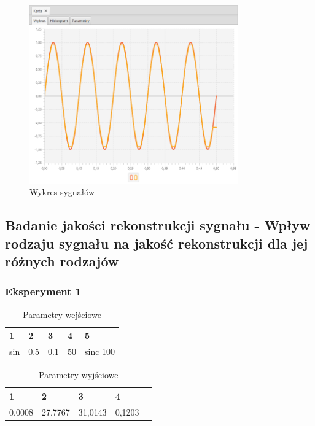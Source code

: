 \documentclass[12pt]{article}
\begin{document}
{{{                \begin{figure}[H]
                    \centering
                    \includegraphics[width=0.8\textwidth]{img/result/experiment1/10/data_draw_original_chart_recon_output_130307.png}
                    \caption{Wykres sygnałów}
                \end{figure}
            }
        }

        \subsection{Badanie jakości rekonstrukcji sygnału - Wpływ rodzaju sygnału na jakość
        rekonstrukcji dla jej różnych rodzajów} {

            \subsubsection{Eksperyment 1} {
                \begin{table}[H]
                    \centering
                    \begin{tabular}{|l|l|l|l|l|}
                        \hline
                        1 & 2 & 3 & 4 & 5   \\ \hline
                        sin & 0.5 & 0.1 & 50 & sinc 100  \\ \hline
                    \end{tabular}
                    \caption{Parametry wejściowe}
                \end{table}

                \begin{table}[H]
                    \centering
                    \begin{tabular}{|l|l|l|l|l|}
                        \hline
                        1 & 2 & 3 & 4   \\ \hline
                        0,0008 & 27,7767 & 31,0143 & 0,1203 \\ \hline
                    \end{tabular}
                    \caption{Parametry wyjściowe}
                \end{table}


}}}
\end{document}
